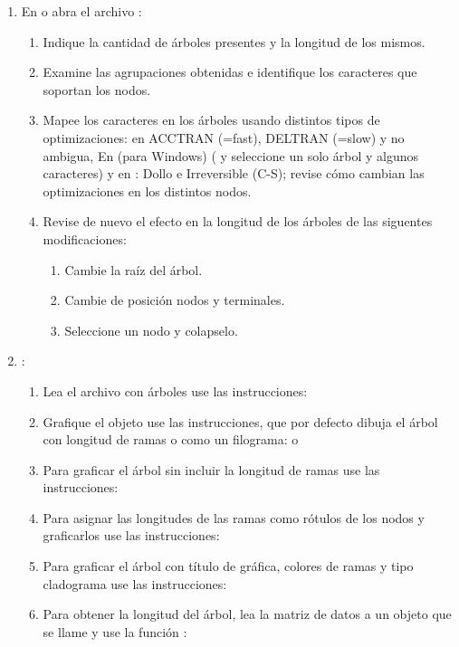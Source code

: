 \begin{enumerate}
	\item En  o  abra el archivo :
	\begin{enumerate}
		\item Indique la cantidad de \'arboles presentes y la longitud de los mismos.
		\item Examine las agrupaciones obtenidas e identifique los caracteres que soportan los nodos.
		\item Mapee los caracteres en los \'arboles usando distintos tipos de optimizaciones: en  ACCTRAN (=fast), DELTRAN (=slow) y no ambigua, En  (para Windows) ( y seleccione un solo \'arbol y algunos caracteres) y en : Dollo e Irreversible (C-S); revise c\'omo cambian las optimizaciones en los distintos nodos.
		\item Revise de nuevo el efecto en la longitud de los \'arboles de las siguentes modificaciones:
		\begin{enumerate}
			\item Cambie la ra\'iz del \'arbol.
			\item Cambie de posici\'on nodos y terminales.
			\item Seleccione un nodo y colapselo.
		\end{enumerate}
	\end{enumerate}

	

	\item \En {}:
	\begin{enumerate}

		\item Lea el archivo con \'arboles  use las instrucciones:
		\item Grafique el objeto  use las instrucciones, que por defecto dibuja el \'arbol con longitud de ramas o como un filograma:
		 o
		\item Para graficar el \'arbol sin incluir la longitud de ramas  use las instrucciones:
		\item Para asignar las longitudes de las ramas como r\'otulos de los nodos y graficarlos use las instrucciones:
		\item Para graficar el \'arbol con t\'itulo de gr\'afica, colores de ramas y tipo cladograma use las instrucciones:
		\item Para obtener la longitud del \'arbol, lea la matriz de datos  a un objeto que se llame  y use la funci\'on :
	\end{enumerate}	


\end{enumerate}


